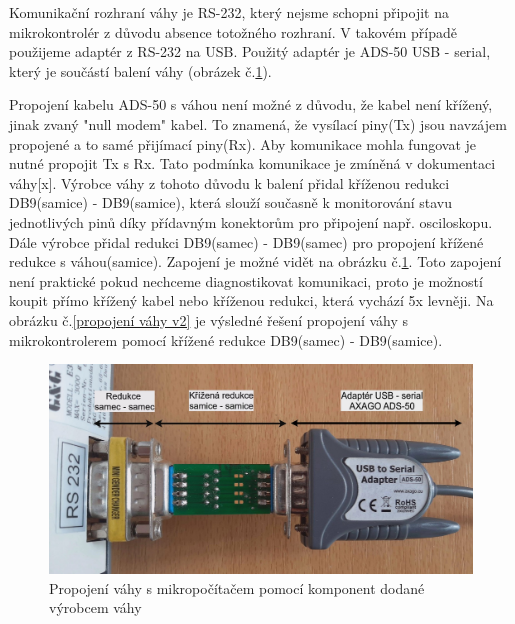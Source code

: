 Komunikační rozhraní váhy je RS-232, který nejsme schopni připojit na mikrokontrolér z důvodu absence totožného rozhraní. V takovém případě použijeme adaptér z RS-232 na USB. Použitý adaptér je ADS-50 USB - serial, který je součástí balení váhy (obrázek č.\ref{propojení váhy v1}).


Propojení kabelu ADS-50 s váhou není možné z důvodu, že kabel není křížený, jinak zvaný "null modem" kabel. To znamená, že vysílací piny(Tx) jsou navzájem propojené a to samé přijímací piny(Rx). Aby komunikace mohla fungovat je nutné propojit Tx s Rx. Tato podmínka komunikace je zmíněná v dokumentaci váhy[x]. Výrobce váhy z tohoto důvodu k balení přidal kříženou redukci DB9(samice) - DB9(samice), která slouží současně k monitorování stavu jednotlivých pinů díky přídavným konektorům pro připojení např. osciloskopu. Dále výrobce přidal redukci DB9(samec) - DB9(samec) pro propojení křížené redukce s váhou(samice). Zapojení je možné vidět na obrázku č.\ref{propojení váhy v1}. Toto zapojení není praktické pokud nechceme diagnostikovat komunikaci, proto je možností koupit přímo křížený kabel nebo kříženou redukci, která vychází 5x levněji. Na obrázku č.\ref{propojení váhy v2} je výsledné řešení propojení váhy s mikrokontrolerem pomocí křížené redukce DB9(samec) - DB9(samice).

\begin{figure}[H]
    \begin{center}
        \includegraphics[scale=0.27]{obrazky/zapojení váhy.jpg}
    \end{center}
    \caption{Propojení váhy s mikropočítačem pomocí komponent dodané výrobcem váhy}
    \label{propojení váhy v1}
\end{figure}

